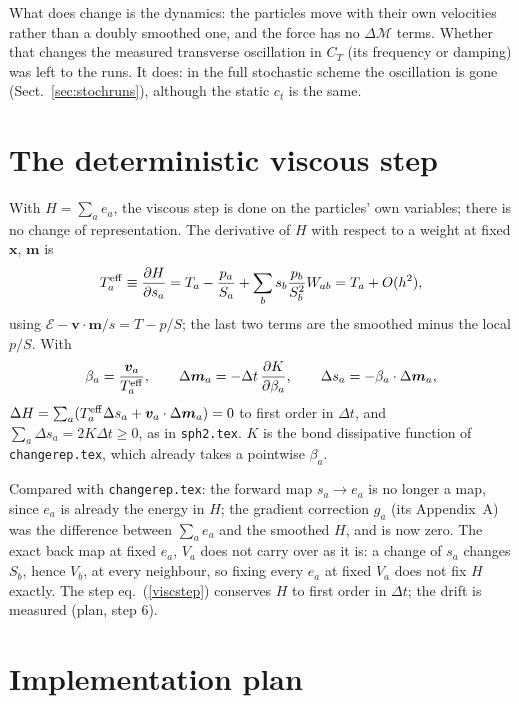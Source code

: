 \documentclass[11pt,aps,preprint,nofootinbib,superscriptaddress,tightenlines]{revtex4-2}
\def\st{\begin{equation}}
\def\stp{\end{equation}}
\def\Eq#1{eq.~(\ref{#1})}
\def\Sect#1{Sect.~\ref{#1}}
\begin{document}
What does change is the dynamics: the particles move with their own velocities
rather than a doubly smoothed one, and the force has no $\Delta\mathcal M$ terms.
Whether that changes the measured transverse oscillation in $C_T$ (its frequency
or damping) was left to the runs.  It does: in the full stochastic scheme the
oscillation is gone (\Sect{sec:stochruns}), although the static $c_t$ is the same.

\section{The deterministic viscous step}
\label{sec:visc}

With $H=\sum_ae_a$, the viscous step is done on the particles' own variables; there
is no change of representation.  The derivative of $H$ with respect to a weight at
fixed $\bm x$, $\bm m$ is
\st
T^{\rm eff}_a\equiv\frac{\partial H}{\partial s_a}
=T_a-\frac{p_a}{S_a}+\sum_bs_b\frac{p_b}{S_b^2}W_{ab}
=T_a+O(h^2),
\label{Teff}
\stp
using $\mathcal E-\bm v\cdot\bm m/s=T-p/S$; the last two terms are the smoothed minus
the local $p/S$.  With
\st
\beta_a=\frac{\bm v_a}{T^{\rm eff}_a},\qquad
\Delta\bm m_a=-\Delta t\,\frac{\partial K}{\partial\beta_a},\qquad
\Delta s_a=-\beta_a\cdot\Delta\bm m_a ,
\label{viscstep}
\stp
$\Delta H=\sum_a(T^{\rm eff}_a\Delta s_a+\bm v_a\cdot\Delta\bm m_a)=0$ to first order
in $\Delta t$, and $\sum_a\Delta s_a=2K\Delta t\ge0$, as in \texttt{sph2.tex}.  $K$ is
the bond dissipative function of \texttt{changerep.tex}, which already takes a
pointwise $\beta_a$.

Compared with \texttt{changerep.tex}: the forward map $s_a\to e_a$ is no longer a
map, since $e_a$ is already the energy in $H$; the gradient correction $g_a$
(its Appendix~A) was the difference between $\sum_ae_a$ and the smoothed $H$, and is
now zero.  The exact back map at fixed $e_a$, $V_a$ does not carry over as it is: a
change of $s_a$ changes $S_b$, hence $V_b$, at every neighbour, so fixing every
$e_a$ at fixed $V_a$ does not fix $H$ exactly.  The step \Eq{viscstep} conserves $H$
to first order in $\Delta t$; the drift is measured (plan, step 6).

\section{Implementation plan}
\label{sec:plan}
\end{document}
